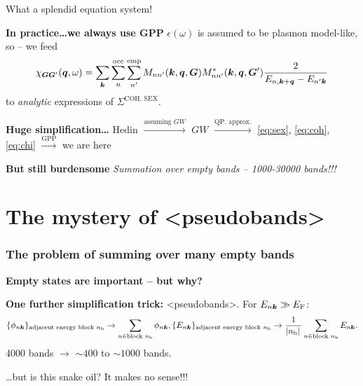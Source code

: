 \documentclass[t]{beamer}
\newcommand{\shortcode}[1]{\texttt{#1}}
\def\\{}%
\def\texttt#1{<#1>}%
\begin{document}
\begin{frame}[allowframebreaks]
What a splendid equation system! 

\textbf{In practice\dots we always use GPP} $\epsilon(\omega)$ is assumed to be 
plasmon model-like, so -- we feed 
\begin{equation}
    \chi_{\vb*{G} \vb*{G}'}(\vb*{q}, \omega)
    = \sum_{\vb*{k}} \sum_{n}^{\text{occ}} \sum_{n'}^{\text{emp}} 
    M_{n n'} (\vb*{k}, \vb*{q}, \vb*{G}) M^*_{nn'} (\vb*{k}, \vb*{q}, \vb*{G}') 
    \frac{
        2
    }{
        E_{n, \vb*{k} + \vb*{q}} - E_{n' \vb*{k}} 
    }
\end{equation}
to \emph{analytic} expressions of $\Sigma^{\text{COH, SEX}}$.

\vspace{1cm}

\textbf{Huge simplification\dots} Hedin $\stackrel{\text{assuming $GW$}}{\rightarrow}$ 
$GW$ $\stackrel{\text{QP. approx.}}{\rightarrow}$ 
\eqref{eq:sex}, \eqref{eq:coh}, \eqref{eq:chi} $\stackrel{\text{GPP}}{\rightarrow}$ we are here

\textbf{But still burdensome} \emph{Summation over empty bands -- 1000-30000 bands!!!}

\end{frame}

\section{The mystery of \shortcode{pseudobands}}

\begin{frame}
\frametitle{The problem of summing over many empty bands}

\textbf{Empty states are important -- but why?}

\vspace{1cm}

\textbf{One further simplification trick:} \shortcode{pseudobands}. 
For $E_{n \vb*{k}} \gg E_{\text{F}}$:
\[
    \begin{aligned}
        \{ \phi_{n \vb*{k}} \}_{\text{adjacent energy block $n_{\text{b}}$}} 
        \rightarrow \sum_{n \in \text{block $n_{\text{b}}$}} \phi_{n \vb*{k}}, \\
        \{ E_{n \vb*{k}} \}_{\text{adjacent energy block $n_{\text{b}}$}} \rightarrow
        \frac{1}{\abs*{n_{\text{b}}}}  \sum_{n \in \text{block $n_{\text{b}}$}} E_{n \vb*{k}}.
    \end{aligned}
\]
4000 bands $\to$ $\sim 400$ to $\sim 1000$ bands.

\vspace{1cm}

\dots but is this snake oil? It makes no sense!!!

\end{frame}
\end{document}
